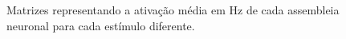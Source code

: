 \begin{figure}[!ht]
\caption{Matrizes representando a ativação média em Hz de cada assembleia neuronal para cada estímulo diferente.}
\end{figure}

